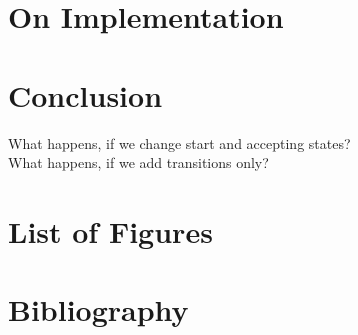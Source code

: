 \documentclass[a4paper, oneside, 11pt]{report}
\theoremstyle{definition}
\theoremstyle{remark}
\begin{document}






\chapter{On Implementation}




\chapter{Conclusion}

What happens, if we change start and accepting states? \\
What happens, if we add transitions only?


\appendix
\chapter{List of Figures}
\chapter{Bibliography}
\end{document}
